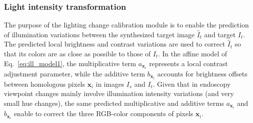 \documentclass[a4paper,fleqn]{cas-dc}
\begin{document}
\subsubsection{Light intensity transformation\label{sec:lit}}
%
The purpose of the lighting change calibration module is to enable the prediction of illumination variations between the synthesized target image $\hat{I}_t$ and target $I_t$. The predicted local brightness and contrast variations are used to correct $\hat{I}_t$ so that its colors are as close as possible to those of $I_t$. In the affine model of Eq.~\eqref{eq:ill_model1}, the multiplicative term $a_{\mathbf{x}_i}$ represents a local contrast adjustment parameter, while the additive term $b_{\mathbf{x}_i}$ accounts for brightness offsets between homologous pixels $\mathbf{x}_i$ in images $I_s$ and $I_t$. Given that in endoscopy viewpoint changes mainly involve illumination intensity variations (and very small hue changes), the same predicted multiplicative and additive terms $a_{\mathbf{x}_i}$ and $b_{\mathbf{x}_i}$ enable to correct the three RGB-color components of pixels $\mathbf{x}_i$. 
\end{document}
